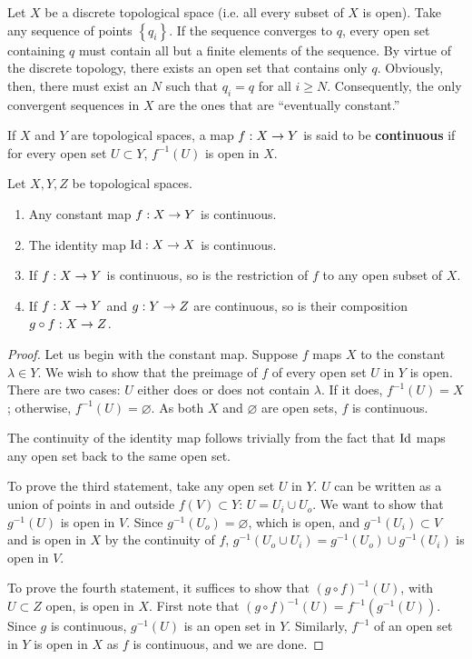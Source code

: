 \documentclass{mathnotes}
\begin{document}
\begin{exmp}
    Let $X$ be a discrete topological space (i.e. all every subset of $X$ is open). Take any sequence of points $\left\{ q_i \right\}$.
    If the sequence converges to $q$, every open set containing $q$ must contain all but a finite elements of the sequence. By virtue of
    the discrete topology, there exists an open set that contains only $q$. Obviously, then, there must exist an $N$ such that
    $q_i=q$ for all $i\geq N$. Consequently, the only convergent sequences in $X$ are the ones that are ``eventually constant.''
\end{exmp}

\begin{defn}
    If $X$ and $Y$ are topological spaces, a map $f:X\rightarrow Y$ is said to be \textbf{continuous} if for every open set
    $U\subset Y$, $f^{-1}(U)$ is open in $X$.
\end{defn}

\begin{lem}
    Let $X, Y, Z$ be topological spaces.
    \begin{enumerate}
        \item Any constant map $f:X\rightarrow Y$ is continuous.
        \item The identity map $\operatorname{Id}: X\rightarrow X$ is continuous.
        \item If $f: X\rightarrow Y$ is continuous, so is the restriction of $f$ to any open subset of $X$.
        \item If $f: X\rightarrow Y$ and $g:Y \rightarrow Z$ are continuous, so is their composition $g \circ f: X\rightarrow Z$.
    \end{enumerate}
\end{lem}
\begin{proof}
    Let us begin with the constant map. Suppose $f$ maps $X$ to the constant $\lambda\in Y$. We wish to show
    that the preimage of $f$ of every open set $U$ in $Y$ is open. There are two cases: $U$ either does or does not contain
    $\lambda$. If it does, $f^{-1}(U)=X$; otherwise, $f^{-1}(U)=\varnothing.$ As both $X$ and $\varnothing$ are open sets,
    $f$ is continuous.

    The continuity of the identity map follows trivially from the fact that $\operatorname{Id}$ maps any open set back to the same open set.

    To prove the third statement, take any open set $U$ in $Y$. $U$ can be written as a union of points in and outside
    $f(V)\subset Y$: $U=U_i\cup U_o$. We want to show that $g^{-1}(U)$ is open in $V$. Since $g^{-1}(U_o)=\varnothing$, which is open,
    and $g^{-1}(U_i)\subset V$ and is open in $X$ by the continuity of $f$, $g^{-1}(U_o\cup U_i)=g^{-1}(U_o)\cup g^{-1}(U_i)$ is open in $V$.

    To prove the fourth statement, it suffices to show that $(g\circ f)^{-1}(U)$, with $U\subset Z$ open, is open in $X$.
    First note that $(g\circ f)^{-1}(U)=f^{-1}(g^{-1}(U))$. Since $g$ is continuous, $g^{-1}(U)$ is an open set in $Y$.
    Similarly, $f^{-1}$ of an open set in $Y$ is open in $X$ as $f$ is continuous, and we are done.
\end{proof}
\end{document}
